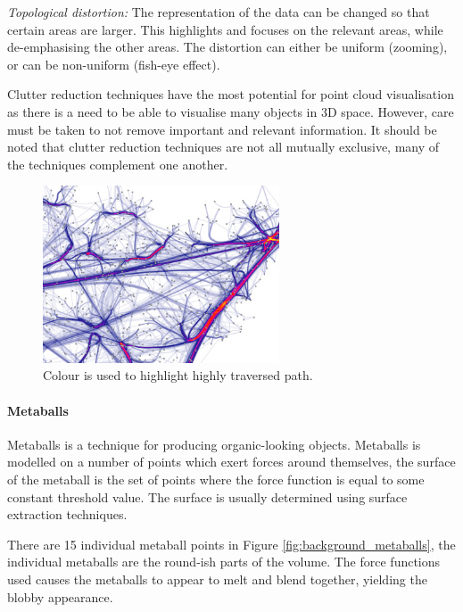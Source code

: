 \emph{Topological distortion:} The representation of the data can be changed so
that certain areas are larger. This highlights and focuses on the relevant
areas, while de-emphasising the other areas. The distortion can either be
uniform (zooming), or can be non-uniform (fish-eye effect).

Clutter reduction techniques have the most potential for point cloud
visualisation as there is a need to be able to visualise many objects in 3D
space. However, care must be taken to not remove important and relevant
information. It should be noted that clutter reduction techniques are not all
mutually exclusive, many of the techniques complement one another.

\begin{figure}
  \begin{center}
    \includegraphics[width=70mm]{graph_highlight}
  \end{center}
  \caption{Colour is used to highlight highly traversed path.}
  \label{fig:background_highlight}
\end{figure}


\paragraph{Metaballs}

Metaballs \citep{blinn82} is a technique for producing organic-looking objects.
Metaballs is modelled on a number of points which exert forces around
themselves, the surface of the metaball is the set of points where the force
function is equal to some constant threshold value. The surface is usually
determined using surface extraction techniques.

There are 15 individual metaball points in Figure
\ref{fig:background_metaballs}, the individual metaballs are the round-ish
parts of the volume. The force functions used causes the metaballs to appear to
melt and blend together, yielding the blobby appearance.

